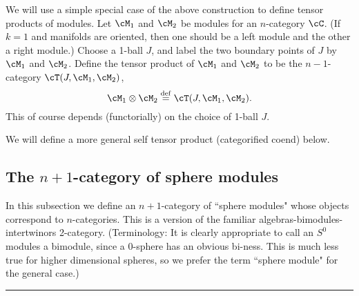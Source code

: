 We will use a simple special case of the above 
construction to define tensor products 
of modules.
Let $\cM_1$ and $\cM_2$ be modules for an $n$-category $\cC$.
(If $k=1$ and manifolds are oriented, then one should be 
a left module and the other a right module.)
Choose a 1-ball $J$, and label the two boundary points of $J$ by $\cM_1$ and $\cM_2$.
Define the tensor product of $\cM_1$ and $\cM_2$ to be the 
$n{-}1$-category $\cT(J, \cM_1, \cM_2)$,
\[
	\cM_1\otimes \cM_2 \deq \cT(J, \cM_1, \cM_2) .
\]
This of course depends (functorially)
on the choice of 1-ball $J$.

We will define a more general self tensor product (categorified coend) below.









\subsection{The $n{+}1$-category of sphere modules}

In this subsection we define an $n{+}1$-category of ``sphere modules" whose objects
correspond to $n$-categories.
This is a version of the familiar algebras-bimodules-intertwinors 2-category.
(Terminology: It is clearly appropriate to call an $S^0$ modules a bimodule,
since a 0-sphere has an obvious bi-ness.
This is much less true for higher dimensional spheres, 
so we prefer the term ``sphere module" for the general case.)




\medskip
\hrule
\medskip

\medskip


